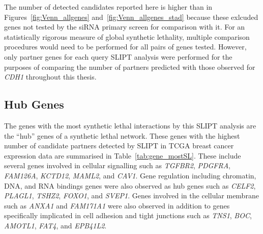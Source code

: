 The number of detected candidates reported here is higher than in Figures~\ref{fig:Venn_allgenes} and~\ref{fig:Venn_allgenes_stad} because these exlcuded genes not tested by the siRNA primary screen \citep{Telford2015} for comparison with it. For an statistically rigorous measure of global synthetic lethality, multiple comparison procedures would need to be performed for all pairs of genes tested. However, only partner genes for each query \gls{SLIPT} analysis were performed for the purposes of comparing the number of partners predicted with those observed for \textit{CDH1} throughout this thesis.


\FloatBarrier

\subsection{Hub Genes}

The genes with the most synthetic lethal interactions by this \gls{SLIPT} analysis are the ``hub'' genes of a synthetic lethal network. These genes with the highest number of candidate partners detected by \gls{SLIPT} in TCGA breast cancer expression data are summarised in Table~\ref{tab:gene_mostSL}.  These include several genes involved in cellular signalling such as \textit{TGFBR2}, \textit{PDGFRA}, \textit{FAM126A}, \textit{KCTD12}, \textit{MAML2}, and \textit{CAV1}. Gene regulation including chromatin, DNA, and RNA bindings genes were also observed as hub genes such as \textit{CELF2}, \textit{PLAGL1}, \textit{TSHZ2}, \textit{FOXO1}, and \textit{SVEP1}. Genes involved in the cellular membrane such as \textit{ANXA1} and \textit{FAM171A1} were also observed in addition to genes specifically implicated in cell adhesion and tight junctions such as \textit{TNS1}, \textit{BOC}, \textit{AMOTL1}, \textit{FAT4}, and \textit{EPB41L2}.

